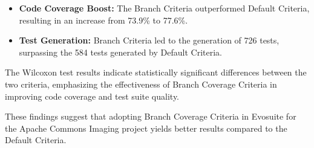 \documentclass[sigconf]{acmart}
\begin{document}
\begin{itemize}
    \item \textbf{Code Coverage Boost:} The Branch Criteria outperformed Default Criteria, resulting in an increase from 73.9\% to 77.6\%.
    \item \textbf{Test Generation:} Branch Criteria led to the generation of 726 tests, surpassing the 584 tests generated by Default Criteria.
\end{itemize}

The Wilcoxon test results indicate statistically significant differences between the two criteria, emphasizing the effectiveness of Branch Coverage Criteria in improving code coverage and test suite quality.

These findings suggest that adopting Branch Coverage Criteria in Evosuite for the Apache Commons Imaging project yields better results compared to the Default Criteria.
\end{document}
